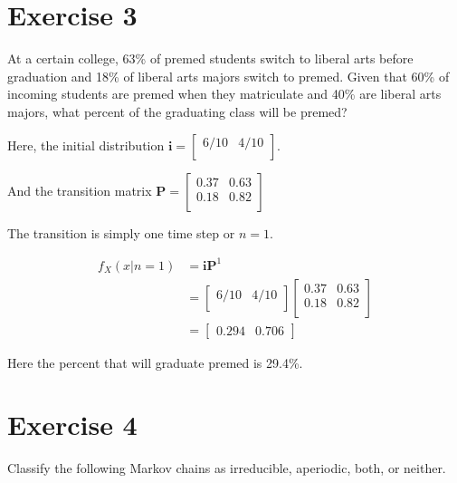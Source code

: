 \documentclass[12pt]{article}
\begin{document}
\section{Exercise 3}
At a certain college, 63\% of premed students switch to liberal arts before graduation and 18\%
of liberal arts majors switch to premed. Given that 60\% of incoming students are premed when
they matriculate and 40\% are liberal arts majors, what percent of the graduating class will be
premed?


\renewcommand{\ID}{%
  \begin{bmatrix}
    6/10 & 4/10 \\
  \end{bmatrix}}

\renewcommand{\TM}{%
  \begin{bmatrix}
    0.37 & 0.63 \\
    0.18 & 0.82 \\
  \end{bmatrix}}

Here, the initial distribution $\bm{i}=\ID$.

And the transition matrix $\bm{P}=\TM$

The transition is simply one time step or $n=1$.

\begin{align*}
  f_X(x|n=1)&=\bm{i}\bm{P}^1\\
            &=\ID\TM\\
            &=
    \begin{bmatrix}
      0.294 & 0.706
    \end{bmatrix}
\end{align*}

Here the percent that will graduate premed is 29.4\%.
\newpage

\section{Exercise 4}
Classify the following Markov chains as irreducible, aperiodic, both, or neither. 
\end{document}
